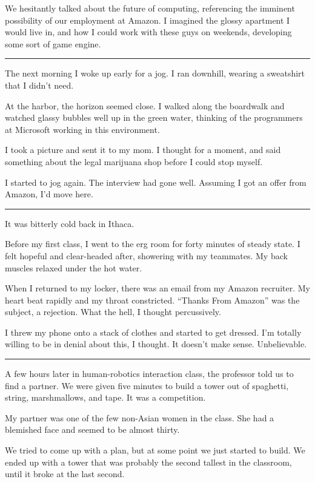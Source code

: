 We hesitantly talked about the future of computing, referencing the imminent
possibility of our employment at Amazon.  I imagined the glossy apartment I
would live in, and how I could work with these guys on weekends, developing some
sort of game engine.

\plainfancybreak{12pt}{2}{}

The next morning I woke up early for a jog.  I ran downhill, wearing a
sweatshirt that I didn't need.

At the harbor, the horizon seemed close.  I walked along the boardwalk and
watched glassy bubbles well up in the green water, thinking of the programmers
at Microsoft working in this environment.

I took a picture and sent it to my mom.  I thought for a moment, and said
something about the legal marijuana shop before I could stop myself.

I started to jog again.  The interview had gone well.  Assuming I got an offer
from Amazon, I'd move here.

\plainfancybreak{12pt}{2}{}

It was bitterly cold back in Ithaca.

Before my first class, I went to the erg room for forty minutes of steady state.
I felt hopeful and clear-headed after, showering with my teammates.  My back
muscles relaxed under the hot water.

When I returned to my locker, there was an email from my Amazon recruiter.  My
heart beat rapidly and my throat constricted.  ``Thanks From Amazon'' was the
subject, a rejection.  What the hell, I thought percussively.

I threw my phone onto a stack of clothes and started to get dressed.  I'm
totally willing to be in denial about this, I thought.  It doesn't make sense.
Unbelievable.

\plainfancybreak{12pt}{2}{}

A few hours later in human-robotics interaction class, the professor told us to find a
partner.  We were given five minutes to build a tower out of spaghetti, string,
marshmallows, and tape.  It was a competition.

My partner was one of the few non-Asian women in the class.  She had a blemished
face and seemed to be almost thirty.

We tried to come up with a plan, but at some point we just started to build. We
ended up with a tower that was probably the second tallest in the classroom,
until it broke at the last second.

